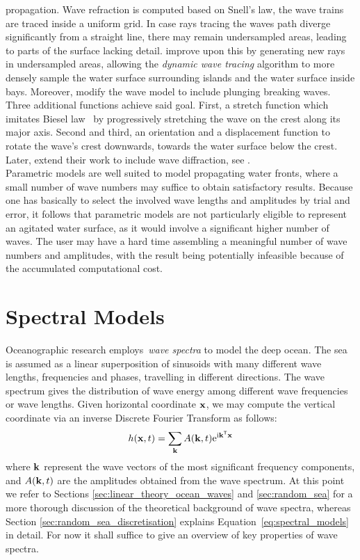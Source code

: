 propagation. Wave refraction is computed based on Snell's law, the wave trains
are traced inside a uniform grid. In case rays tracing the waves path diverge
significantly from a straight line, there may remain undersampled areas,
leading to parts of the surface lacking detail. \cite{Gonzato:1997} improve
upon this by generating new rays in undersampled areas, allowing the
\emph{dynamic wave tracing} algorithm to more densely sample the water surface
surrounding islands and the water surface inside bays. Moreover,
\citeauthor{Gonzato:1997} modify the wave model to include plunging breaking
waves. Three additional functions achieve said goal.
First, a stretch function which imitates Biesel law~\citep{Biesel:1952} by
progressively stretching the wave on the crest along its major axis. Second and
third, an orientation and a displacement function to rotate the wave's crest
downwards, towards the water surface below the crest. Later,
\citeauthor{Gonzato:2000} extend their work to include wave diffraction, see
\cite{Gonzato:2000}.\\

Parametric models are well suited to model propagating water fronts, where a
small number of wave numbers may suffice to obtain satisfactory results. 
Because one has basically to select the involved wave lengths and amplitudes
by trial and error, it follows that parametric models are not particularly
eligible to represent an agitated water surface, as it would involve a
significant higher number of waves. The user may have a hard time assembling a
meaningful number of wave numbers and amplitudes, with the result being
potentially infeasible because of the accumulated computational cost.
\section{Spectral Models}
Oceanographic research employs~\emph{wave spectra} to model the deep ocean. The
sea is assumed as a linear superposition of sinusoids with many different wave
lengths, frequencies and phases, travelling in different directions. The wave
spectrum gives the distribution of wave energy among different wave frequencies
or wave lengths. Given horizontal coordinate $\mathbf{x}$, we may compute the
vertical coordinate via an inverse Discrete Fourier Transform as follows:
\begin{equation}
h(\mathbf{x},t) = \sum_{\mathbf{k}}A(\mathbf{k},t)\mathrm{e}^{\mathrm{i}\mathbf{k}^{\mathsf{T}}\mathbf{x}}
\label{eq:spectral_models}
\end{equation}
where $\mathbf{k}$ represent the wave vectors of the most significant frequency
components, and $A(\mathbf{k},t)$ are the amplitudes obtained from the wave
spectrum. At this point we refer to Sections \ref{sec:linear_theory_ocean_waves}
and \ref{sec:random_sea} for a more thorough discussion of the theoretical
background of wave spectra, whereas Section \ref{sec:random_sea_discretisation}
explains Equation~\ref{eq:spectral_models} in detail. For now it shall suffice
to give an overview of key properties of wave spectra. 

